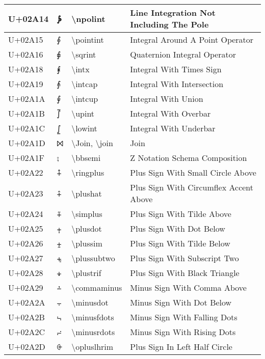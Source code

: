\begin{table}[h]
\begin{tabulary}{\linewidth}{|L|L|L|L|}
U+02A14 & ⨔ & {\textbackslash}npolint & Line Integration Not Including The Pole \\
\hline
U+02A15 & ⨕ & {\textbackslash}pointint & Integral Around A Point Operator \\
\hline
U+02A16 & ⨖ & {\textbackslash}sqrint & Quaternion Integral Operator \\
\hline
U+02A18 & ⨘ & {\textbackslash}intx & Integral With Times Sign \\
\hline
U+02A19 & ⨙ & {\textbackslash}intcap & Integral With Intersection \\
\hline
U+02A1A & ⨚ & {\textbackslash}intcup & Integral With Union \\
\hline
U+02A1B & ⨛ & {\textbackslash}upint & Integral With Overbar \\
\hline
U+02A1C & ⨜ & {\textbackslash}lowint & Integral With Underbar \\
\hline
U+02A1D & ⨝ & {\textbackslash}Join, {\textbackslash}join & Join \\
\hline
U+02A1F & ⨟ & {\textbackslash}bbsemi & Z Notation Schema Composition \\
\hline
U+02A22 & ⨢ & {\textbackslash}ringplus & Plus Sign With Small Circle Above \\
\hline
U+02A23 & ⨣ & {\textbackslash}plushat & Plus Sign With Circumflex Accent Above \\
\hline
U+02A24 & ⨤ & {\textbackslash}simplus & Plus Sign With Tilde Above \\
\hline
U+02A25 & ⨥ & {\textbackslash}plusdot & Plus Sign With Dot Below \\
\hline
U+02A26 & ⨦ & {\textbackslash}plussim & Plus Sign With Tilde Below \\
\hline
U+02A27 & ⨧ & {\textbackslash}plussubtwo & Plus Sign With Subscript Two \\
\hline
U+02A28 & ⨨ & {\textbackslash}plustrif & Plus Sign With Black Triangle \\
\hline
U+02A29 & ⨩ & {\textbackslash}commaminus & Minus Sign With Comma Above \\
\hline
U+02A2A & ⨪ & {\textbackslash}minusdot & Minus Sign With Dot Below \\
\hline
U+02A2B & ⨫ & {\textbackslash}minusfdots & Minus Sign With Falling Dots \\
\hline
U+02A2C & ⨬ & {\textbackslash}minusrdots & Minus Sign With Rising Dots \\
\hline
U+02A2D & ⨭ & {\textbackslash}opluslhrim & Plus Sign In Left Half Circle \\

\end{tabulary}
\end{table}
